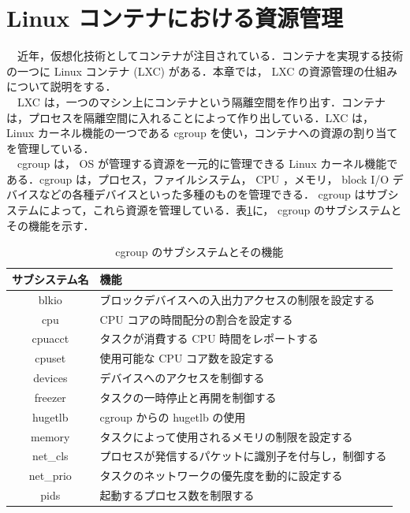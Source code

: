 \documentclass[graduation-thesis]{jsarticle}
\begin{document}
\section{Linux コンテナにおける資源管理}
\label{sec:LXC}
　近年，仮想化技術としてコンテナが注目されている．コンテナを実現する技術の一つに Linux コンテナ (LXC) がある．本章では， LXC の資源管理の仕組みについて説明をする．\\
　LXC は，一つのマシン上にコンテナという隔離空間を作り出す．コンテナは，プロセスを隔離空間に入れることによって作り出している．LXC は， Linux カーネル機能の一つである cgroup を使い，コンテナへの資源の割り当てを管理している．\\
　cgroup は， OS が管理する資源を一元的に管理できる Linux カーネル機能である．cgroup は，プロセス，ファイルシステム， CPU ，メモリ， block I/O デバイスなどの各種デバイスといった多種のものを管理できる． cgroup はサブシステムによって，これら資源を管理している．表\ref{tb:subsystem}に， cgroup のサブシステムとその機能を示す．\\
\begin{table}[htb]
	\begin{center}
		\caption{cgroup のサブシステムとその機能}
		\begin{tabular}{|c||l|} \hline
			サブシステム名 & 機能\\
			\hline \hline
			blkio & ブロックデバイスへの入出力アクセスの制限を設定する\\
			\hline
			cpu & CPU コアの時間配分の割合を設定する\\
			\hline
			cpuacct & タスクが消費する CPU 時間をレポートする\\
			\hline
			cpuset & 使用可能な CPU コア数を設定する\\
			\hline
			devices & デバイスへのアクセスを制御する\\
			\hline
			freezer & タスクの一時停止と再開を制御する\\
			\hline
			hugetlb & cgroup からの hugetlb の使用\\
			\hline
			memory & タスクによって使用されるメモリの制限を設定する\\
			\hline
			net\_cls & プロセスが発信するパケットに識別子を付与し，制御する\\
			\hline
			net\_prio & タスクのネットワークの優先度を動的に設定する\\
			\hline
			pids & 起動するプロセス数を制限する\\
			\hline
		\end{tabular}
		\label{tb:subsystem}
	\end{center}
\end{table}
\end{document}
